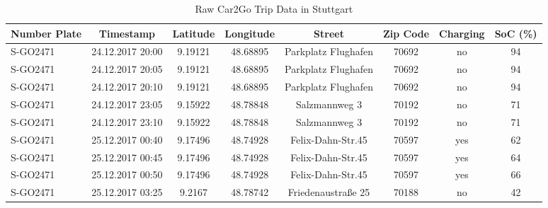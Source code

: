 \begin{sidewaystable}[htbp]
    \caption{Raw Car2Go Trip Data in Stuttgart \label{data-car2go-raw}}
    \centering
    \begin{tabular}{l|ccccccc}
      \hline
      \hline
      Number Plate & Timestamp & Latitude & Longitude & Street & Zip Code & Charging & SoC (\%)\\
      \hline
      S-GO2471 & 24.12.2017 20:00 & 9.19121 & 48.68895 & Parkplatz Flughafen & 70692 & no & 94\\
      S-GO2471 & 24.12.2017 20:05 & 9.19121 & 48.68895 & Parkplatz Flughafen & 70692 & no & 94\\
      S-GO2471 & 24.12.2017 20:10 & 9.19121 & 48.68895 & Parkplatz Flughafen & 70692 & no & 94\\
      S-GO2471 & 24.12.2017 23:05 & 9.15922 & 48.78848 & Salzmannweg 3 & 70192 & no & 71\\
      S-GO2471 & 24.12.2017 23:10 & 9.15922 & 48.78848 & Salzmannweg 3 & 70192 & no & 71\\
      S-GO2471 & 25.12.2017 00:40 & 9.17496 & 48.74928 & Felix-Dahn-Str.45 & 70597 & yes & 62\\
      S-GO2471 & 25.12.2017 00:45 & 9.17496 & 48.74928 & Felix-Dahn-Str.45 & 70597 & yes & 64\\
      S-GO2471 & 25.12.2017 00:50 & 9.17496 & 48.74928 & Felix-Dahn-Str.45 & 70597 & yes & 66\\
      S-GO2471 & 25.12.2017 03:25 & 9.2167 & 48.78742 & Friedenaustraße 25 & 70188 & no & 42\\
      \hline
      \hline
    \end{tabular}

    \bigskip\bigskip  %


\end{sidewaystable}
